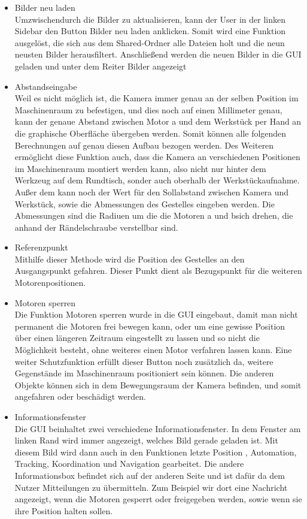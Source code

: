 \documentclass[12pt,a4paper,bibliography=totocnumbered,listof=totocnumbered]{scrartcl}
\begin{document}
\begin{itemize}
\begin{itemize}
\item Bilder neu laden\\
Umzwischendurch die Bilder zu aktualisieren, kann der User in der linken Sidebar den Button \glqq Bilder neu laden\grqq{} anklicken. Somit wird eine Funktion ausgelöst, die sich aus dem \glqq Shared-Ordner\grqq{} alle Dateien holt und die neun neusten Bilder herausfiltert. Anschließend werden die neuen Bilder in die GUI geladen und unter dem Reiter \glqq Bilder \grqq{} angezeigt
\item Abstandseingabe\\ 
Weil es nicht möglich ist, die Kamera immer genau an der selben Position  im Maschinenraum zu befestigen, und dies noch auf einen Millimeter genau, kann der genaue Abstand zwischen Motor \glqq a\grqq{} und dem Werkstück per Hand an die graphische Oberfläche übergeben werden. Somit können alle folgenden Berechnungen auf genau diesen Aufbau bezogen werden. Des Weiteren ermöglicht diese Funktion auch, dass die Kamera an verschiedenen Positionen im Maschinenraum montiert werden kann, also nicht nur hinter dem Werkzeug auf dem Rundtisch, sonder auch oberhalb der Werkstückaufnahme. Außer dem kann noch der Wert für den Sollabstand zwischen Kamera und Werkstück, sowie die Abmessungen des Gestelles eingeben werden. Die Abmessungen sind die Radiuen um die die Motoren \glqq a\grqq{} und \glqq b\grqq sich drehen, die anhand der Rändelschraube verstellbar sind.
\item Referenzpunkt\\
Mithilfe dieser Methode wird die Position des Gestelles an den Ausgangspunkt gefahren. Dieser Punkt dient als Bezugspunkt für die weiteren Motorenpositionen.
\item Motoren sperren\\
Die Funktion Motoren sperren wurde in die GUI eingebaut, damit man nicht permanent die Motoren frei bewegen kann, oder um eine gewisse Position über einen längeren Zeitraum eingestellt zu lassen und so nicht die Möglichkeit besteht, ohne weiteres einen Motor verfahren lassen kann. Eine weiter Schutzfunktion erfüllt dieser Button noch zusätzlich da, weitere Gegenstände im Maschinenraum positioniert sein können. Die anderen Objekte können  sich in dem Bewegungsraum der Kamera befinden, und somit angefahren oder beschädigt werden.
\item Informationsfenster\\
Die GUI beinhaltet zwei verschiedene Informationsfenster. In dem Fenster am linken Rand wird immer angezeigt, welches Bild gerade geladen ist. Mit diesem Bild wird dann auch in den Funktionen \glqq letzte Position \grqq{}, \glqq Automation\grqq{}, \glqq Tracking\grqq{}, \glqq Koordination\grqq{} und  \glqq Navigation\grqq{} gearbeitet. Die andere Informationsbox befindet sich auf der anderen Seite und ist dafür da dem Nutzer Mitteilungen zu übermitteln. Zum Beispiel wir dort eine Nachricht angezeigt, wenn die Motoren gesperrt oder freigegeben werden, sowie wenn sie ihre Position halten sollen.

\end{itemize}
\end{itemize}
\end{document}
